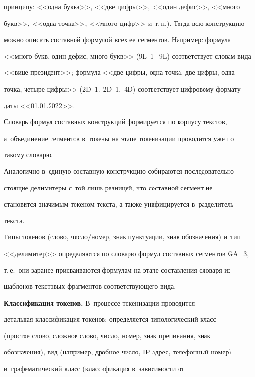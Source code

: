 принципу: <<одна буква>>, <<две цифры>>, <<один дефис>>, <<много 


букв>>, <<одна точка>>, <<много цифр>> и~т.\,п.). Тогда всю конструкцию 


можно описать составной формулой всех ее сегментов. Например: формула 


<<много букв, один дефис, много букв>> (9L~1-~9L) соответствует словам вида 


<<вице-президент>>; формула <<две цифры, одна точка, две цифры, одна 


точка, четыре цифры>> (2D~1.~2D~1.~4D) соответствует цифровому формату 


даты <<01.01.2022>>.


  Словарь формул составных конструкций формируется по корпусу текстов, 


а~объединение сегментов в~токены на этапе токенизации проводится уже по 


такому словарю.


  


  Аналогично в~единую составную конструкцию собираются последовательно 


стоящие делимитеры с~той лишь разницей, что составной сегмент не 


становится значимым токеном текста, а также унифицируется в~разделитель 


текста.


  


  Типы токенов (слово, чис\-ло\!/\!но\-мер, знак пунктуации, знак обозначения) и~тип 


<<делимитер>> определяются по словарю формул составных сегментов GA\_3, 


т.\,е.\ они заранее присваиваются формулам на этапе составления словаря из 


шаблонов текстовых фрагментов соответствующего вида.


  


  \textbf{Классификация токенов.} В~процессе токенизации проводится 


детальная классификация токенов: определяется типологический класс 


(простое слово, сложное слово, число, номер, знак препинания, знак 


обозначения), вид (например, дроб\-ное число, IP-ад\-рес, телефонный номер) 


и~графематический класс (классификация в~зависимости от  


